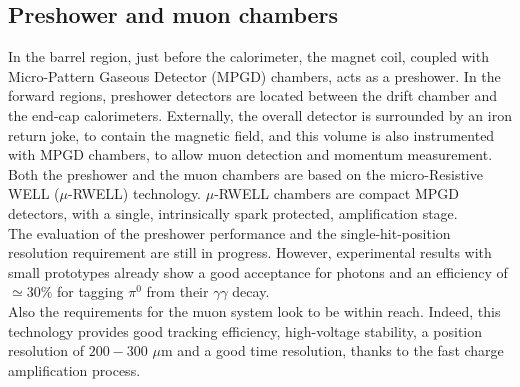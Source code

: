 \subsection{Preshower and muon chambers}
In the barrel region, just before the calorimeter, the magnet coil, coupled with Micro-Pattern Gaseous Detector (MPGD) chambers, acts as a preshower.
In the forward regions, preshower detectors are located between the drift chamber and the end-cap calorimeters.
Externally, the overall detector is surrounded by an iron return joke, to contain the magnetic field, and this volume is also instrumented with MPGD chambers, to allow muon detection and momentum measurement.
Both the preshower and the muon chambers are based on the micro-Resistive WELL ($\mu$-RWELL) technology. $\mu$-RWELL chambers are compact MPGD detectors, with a single, intrinsically spark protected, amplification stage. \\
The evaluation of the preshower performance and the single-hit-position resolution requirement are still in progress.
However, experimental results with small prototypes already show a good acceptance for photons and an efficiency of $\simeq 30\%$ for tagging $\pi^0$ from their $\gamma\gamma$ decay.\\
Also the requirements for the muon system look to be within reach. Indeed, this technology provides good tracking efficiency, high-voltage stability, a position resolution of $200-300$ $\mu$m and a good time resolution, thanks to the fast charge amplification process.\\
